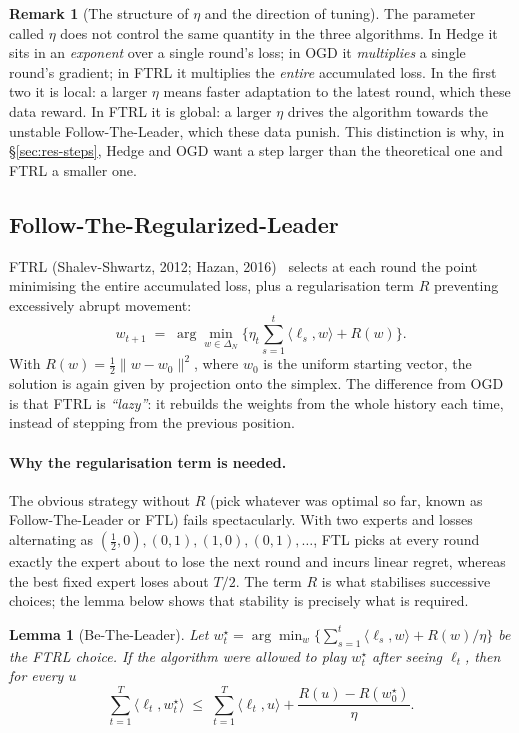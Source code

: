 \documentclass[12pt,a4paper,oneside]{report}
\renewcommand{\_}{\oldunderscore\allowbreak}
\theoremstyle{definition}
\theoremstyle{plain}
\newtheorem{lemma}[theorem]{Lemma}
\theoremstyle{definition}   %
\newtheorem{remark}[theorem]{Remark}
\begin{document}
\begin{remark}[The structure of $\eta$ and the direction of tuning]
\label{rem:eta-structure}
The parameter called $\eta$ does not control the same quantity in the three algorithms. In
Hedge it sits in an \emph{exponent} over a single round's loss; in OGD it \emph{multiplies} a
single round's gradient; in FTRL it multiplies the \emph{entire} accumulated loss. In the first
two it is local: a larger $\eta$ means faster adaptation to the latest round, which these data
reward. In FTRL it is global: a larger $\eta$ drives the algorithm towards the unstable
Follow-The-Leader, which these data punish. This distinction is why, in \S\ref{sec:res-steps},
Hedge and OGD want a step larger than the theoretical one and FTRL a smaller one.
\end{remark}

\subsection{Follow-The-Regularized-Leader}

FTRL (Shalev-Shwartz, 2012; Hazan, 2016)~\cite{shalevshwartz2012,hazan2016} selects at each round
the point minimising the entire accumulated loss, plus a regularisation term $R$ preventing
excessively abrupt movement:
\[
w_{t+1} \;=\; \arg\min_{w \in \Delta_N} \Big\{ \eta_t \sum_{s=1}^{t} \langle \ell_s, w \rangle
+ R(w) \Big\}.
\]
With $R(w) = \tfrac12\|w - w_0\|^2$, where $w_0$ is the uniform starting vector, the solution is
again given by projection onto the simplex.
The difference from OGD is that FTRL is \emph{``lazy''}: it rebuilds the weights from the whole
history each time, instead of stepping from the previous position.

\paragraph{Why the regularisation term is needed.} The obvious strategy without $R$ (pick
whatever was optimal so far, known as Follow-The-Leader or FTL) fails spectacularly. With two experts and
losses alternating as $(\tfrac12,0),(0,1),(1,0),(0,1),\dots$, FTL picks at every round exactly
the expert about to lose the next round and incurs linear regret, whereas the best fixed expert
loses about $T/2$. The term $R$ is what stabilises successive choices; the lemma below shows
that stability is precisely what is required.

\begin{lemma}[Be-The-Leader]
\label{lem:btl}
Let $w^{\star}_t = \arg\min_{w} \{\sum_{s=1}^{t}\langle \ell_s,w\rangle + R(w)/\eta\}$ be the
FTRL choice. If the algorithm were allowed to play $w^{\star}_t$ \emph{after} seeing $\ell_t$,
then for every $u$
\[
\sum_{t=1}^{T} \langle \ell_t, w^{\star}_t\rangle \;\leq\; \sum_{t=1}^{T} \langle \ell_t, u\rangle
+ \frac{R(u) - R(w^{\star}_0)}{\eta}.
\]
\end{lemma}
\end{document}
